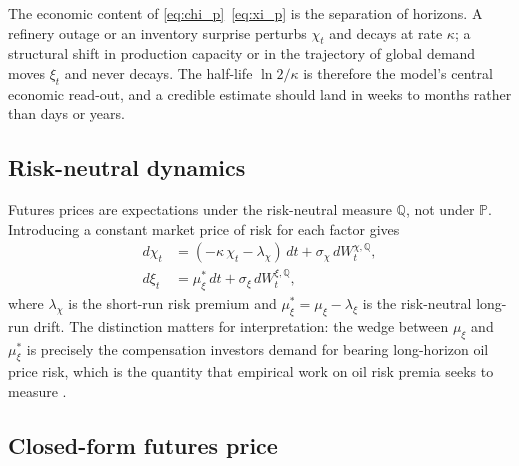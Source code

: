 \documentclass[journal]{IEEEtran}
\begin{document}
The economic content of \eqref{eq:chi_p}~\eqref{eq:xi_p} is the separation of horizons. A refinery outage or an inventory surprise perturbs $\chi_t$ and decays at rate $\kappa$; a structural shift in production capacity or in the trajectory of global demand moves $\xi_t$ and never decays. The half-life $\ln 2 / \kappa$ is therefore the model's central economic read-out, and a credible estimate should land in weeks to months rather than days or years.

\subsection{Risk-neutral dynamics}

Futures prices are expectations under the risk-neutral measure $\mathbb{Q}$, not under $\mathbb{P}$. Introducing a constant market price of risk for each factor gives
%
\begin{align}
  d\chi_t &= (-\kappa\,\chi_t - \lambda_\chi)\,dt + \sigma_\chi\,dW^{\chi,\mathbb{Q}}_t ,
  \label{eq:chi_q} \\[2pt]
  d\xi_t  &= \mu_\xi^{*}\,dt + \sigma_\xi\,dW^{\xi,\mathbb{Q}}_t ,
  \label{eq:xi_q}
\end{align}
%
where $\lambda_\chi$ is the short-run risk premium and $\mu_\xi^{*} = \mu_\xi - \lambda_\xi$ is the risk-neutral long-run drift. The distinction matters for interpretation: the wedge between $\mu_\xi$ and $\mu_\xi^{*}$ is precisely the compensation investors demand for bearing long-horizon oil price risk, which is the quantity that empirical work on oil risk premia seeks to measure \cite{HamiltonWu2014, Cortazar2022}.

\subsection{Closed-form futures price}
\end{document}
